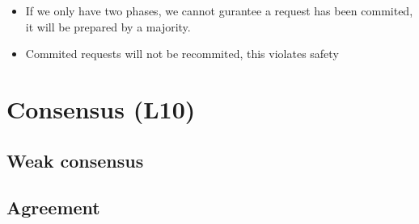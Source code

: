 \documentclass{easyclass}
\begin{document}
\begin{itemize}
    \item If we only have two phases, we cannot gurantee a request has been commited,
    it will be prepared by a majority.
    \item Commited requests will not be recommited, this violates safety
\end{itemize}
\chapter{Consensus (L10)}
\section{Weak consensus}
\section{Agreement}
%


\cite{Gao}


\end{document}
